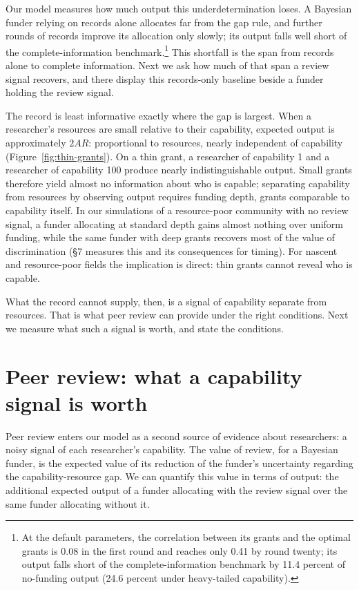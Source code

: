 \documentclass[article, 11pt, reqno]{amsart}
\theoremstyle{named}
\begin{document}
Our model measures how much output this underdetermination loses. A Bayesian funder relying on
records alone allocates far from the gap rule, and further rounds of records improve its
allocation only slowly; its output falls well short of the complete-information
benchmark.\footnote{At the default parameters, the correlation between its grants and
the optimal grants is 0.08 in the first round and reaches only 0.41 by round twenty; its
output falls short of the complete-information benchmark by 11.4 percent of no-funding
output (24.6 percent under heavy-tailed capability).} This shortfall is the span from
records alone to complete
information. Next we ask how much of that span a review signal recovers, and there
display this records-only baseline beside a funder holding the review signal.

The record is least informative exactly where the gap is largest. When a researcher's
resources are small relative to their capability, expected output is approximately
$2AR$: proportional to resources, nearly independent of capability
(Figure~\ref{fig:thin-grants}). On a thin grant, a researcher of capability 1 and a
researcher of capability 100 produce nearly indistinguishable output. Small grants
therefore yield almost no information about who is capable; separating capability from
resources by observing output requires funding depth, grants comparable to capability
itself. In our simulations of a resource-poor community with no review signal, a funder
allocating at standard depth gains almost nothing over uniform funding, while the same
funder with deep grants recovers most of the value of discrimination (\S7 measures this
and its consequences for timing). For nascent and resource-poor fields the implication
is direct: thin grants cannot reveal who is capable.



What the record cannot supply, then, is a signal of capability separate from resources.
That is what peer review can provide under the right conditions. Next we measure what
such a signal is worth, and state the conditions.

\section{Peer review: what a capability signal is worth}\label{sec:review}

Peer review enters our model as a second source of evidence about researchers: a noisy
signal of each researcher's capability. The value of review, for a Bayesian funder, is
the expected value of its reduction of the funder's uncertainty regarding the
capability-resource gap. We can quantify this value in terms of output: the additional
expected output of a funder allocating with the review signal over the same funder
allocating without it.
\end{document}
